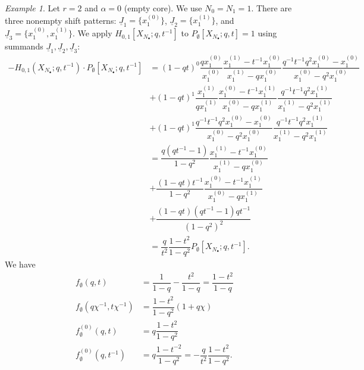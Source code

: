 \documentclass{amsart}
\newcommand{\Nd}{{N_\bullet}}
\newcommand{\Ju}{{\underline{J}}}
\theoremstyle{remark}
\newtheorem{ex}[thm]{Example}
\numberwithin{thm}{section}
\numberwithin{equation}{section}
\begin{document}
\begin{ex} Let $r=2$ and $\alpha=0$ (empty core). We use $N_0=N_1=1$. 
There are three nonempty shift patterns: $\Ju_1 = \{x_1^{(0)}\}$, $\Ju_2=\{x_1^{(1)}\}$, and 
$\Ju_3 = \{x_1^{(0)},x_1^{(1)}\}$. We apply $H_{0,1}[X_{\Nd};q,t^{-1}]$ to $P_\emptyset[X_{\Nd};q,t]=1$ using summands $\Ju_1,\Ju_2,\Ju_3$:
\begin{align*}
  - H_{0,1}(X_{\Nd};q,t^{-1})\cdot P_\emptyset[X_{\Nd};q,t^{-1}] &= 
  (1-qt)^0 \dfrac{q x_1^{(0)}}{x_1^{(0)}} \dfrac{x_1^{(1)}-t^{-1} x_1^{(0)}}{x_1^{(1)}-q x_1^{(0)}}
  \dfrac{q^{-1}t^{-1} q^2 x_1^{(0)} - x_1^{(0)}}{x_1^{(0)}-q^2 x_1^{(0)}} \\
  &+ (1-qt)^1 \dfrac{x_1^{(1)}}{q x_1^{(1)}} \dfrac{x_1^{(0)}-t^{-1} x_1^{(1)}}{x_1^{(0)}-q x_1^{(1)}} 
  \dfrac{q^{-1}t^{-1}q^2 x_1^{(1)}}{x_1^{(1)}-q^2x_1^{(1)}} \\
  &+ (1-qt)^1 \dfrac{q^{-1}t^{-1} q^2 x_1^{(0)}- x_1^{(0)}}{x_1^{(0)}-q^2 x_1^{(0)}}
  \dfrac{q^{-1}t^{-1} q^2 x_1^{(1)}}{x_1^{(1)}-q^2 x_1^{(1)}}\\
  &= \dfrac{q (qt^{-1}-1)}{1-q^2} \dfrac{x_1^{(1)}-t^{-1} x_1^{(0)}}{x_1^{(1)}-qx_1^{(0)}} \\
  &+\dfrac{(1-qt)t^{-1}}{1-q^2}\dfrac{x_1^{(0)}-t^{-1}x_1^{(1)}}{x_1^{(0)}-qx_1^{(1)}}\\
  &+\dfrac{(1-qt)(qt^{-1}-1)qt^{-1}}{(1-q^2)^2} \\
  &= \dfrac{q}{t^2} \dfrac{1-t^2}{1-q^2} P_{\emptyset}[X_{\Nd};q,t^{-1}].
\end{align*}
We have
\begin{align*}
f_{\emptyset}(q,t) &= \dfrac{1}{1-q} - \dfrac{t^2}{1-q} = \dfrac{1-t^2}{1-q} \\
f_{\emptyset}(q\chi^{-1},t\chi^{-1}) &= \dfrac{1-t^2}{1-q^2} (1 + q \chi) \\
f_{\emptyset}^{(0)}(q,t) &= q \dfrac{1-t^2}{1-q^2} \\
f_{\emptyset}^{(0)}(q,t^{-1}) &= q \dfrac{1-t^{-2}}{1-q^2} = - \dfrac{q}{t^2} \dfrac{1-t^2}{1-q^2}.
\end{align*}
\end{ex}
\end{document}
